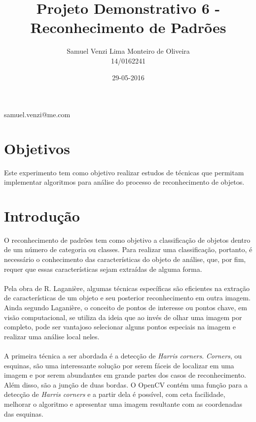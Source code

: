 \documentclass[conference, harvard, brazil, english]{sbatex}
\begin{document}
	\title{Projeto Demonstrativo 6 - Reconhecimento de Padrões}
	\date{29-05-2016}
	\author{Samuel Venzi Lima Monteiro de Oliveira\\14/0162241}{samuel.venzi@me.com}
	\address{SQN 208\\Brasília\\Brasil}
	
	
	\section{Objetivos}
		\paragraph{}
		Este experimento tem como objetivo realizar estudos de técnicas que permitam implementar algoritmos para análise do processo de reconhecimento de objetos.
		
	\section{Introdução}
		\paragraph{}
		O reconhecimento de padrões tem como objetivo a classificação de objetos dentro de um número de categoria ou classes. Para realizar uma classificação, portanto, é necessário o conhecimento das características do objeto de análise, que, por fim, requer que essas características sejam extraídas de alguma forma.
		\paragraph{}
		Pela obra de R. Laganière, algumas técnicas específicas são eficientes na extração de características de um objeto e seu posterior reconhecimento em outra imagem. Ainda segundo Laganière, o conceito de pontos de interesse ou pontos chave, em visão computacional, se utiliza da ideia que ao invés de olhar uma imagem por completo, pode ser vantajoso selecionar alguns pontos especiais na imagem e realizar uma análise local neles.
		\paragraph{}
		A primeira técnica a ser abordada é a detecção de \textit{Harris corners}. \textit{Corners}, ou esquinas, são uma interessante solução por serem fáceis de localizar em uma imagem e por serem abundantes em grande partes dos casos de reconhecimento. Além disso, são a junção de duas bordas. O OpenCV contém uma função para a detecção de \textit{Harris corners} e a partir dela é possível, com ceta facilidade, melhorar o algoritmo e apresentar uma imagem resultante com as coordenadas das esquinas.
\end{document}
